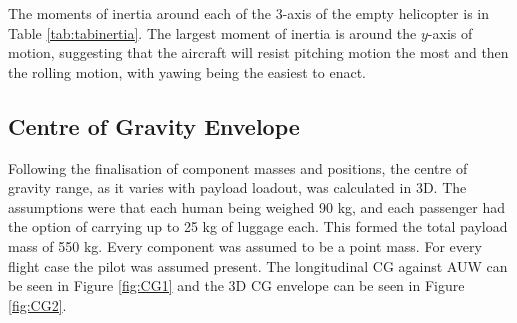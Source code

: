 \documentclass[11pt,a4paper]{article}
\begin{document}
The moments of inertia around each of the 3-axis of the empty helicopter is in Table \ref{tab:tabinertia}. The largest moment of inertia is around the $y$-axis of motion, suggesting that the aircraft will resist pitching motion the most and then the rolling motion, with yawing being the easiest to enact.


\subsection{Centre of Gravity Envelope}
Following the finalisation of component masses and positions, the centre of gravity range, as it varies with payload loadout, was calculated in 3D. The assumptions were that each human being weighed 90 kg, and each passenger had the option of carrying up to 25 kg of luggage each. This formed the total payload mass of 550 kg. Every component was assumed to be a point mass. For every flight case the pilot was assumed present.
The longitudinal CG against AUW can be seen in Figure \ref{fig:CG1} and the 3D CG envelope can be seen in Figure \ref{fig:CG2}.
\end{document}

